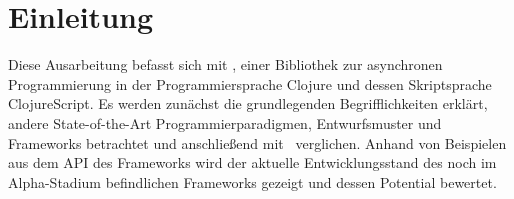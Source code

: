 \chapter{Einleitung}
Diese Ausarbeitung befasst sich mit \CA , einer Bibliothek zur asynchronen Programmierung in der Programmiersprache Clojure und dessen Skriptsprache ClojureScript. Es werden zunächst die grundlegenden Begrifflichkeiten erklärt, andere State-of-the-Art Programmierparadigmen, Entwurfsmuster und Frameworks betrachtet und anschließend mit \CA\  verglichen. Anhand von Beispielen aus dem \acf{API} des Frameworks wird der aktuelle Entwicklungsstand des noch im Alpha-Stadium befindlichen Frameworks gezeigt und dessen Potential bewertet.
\acresetall